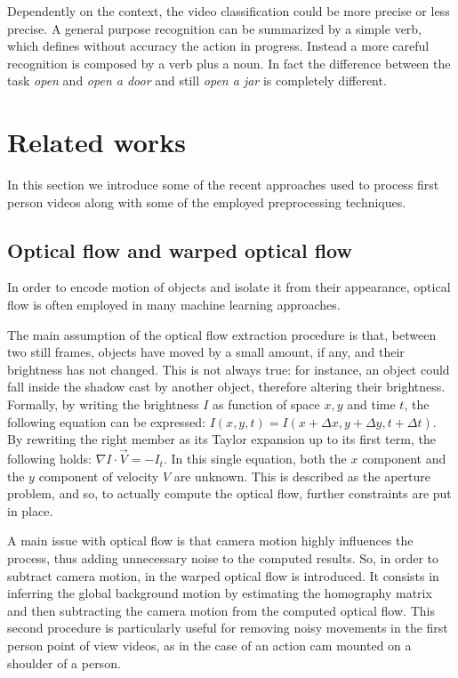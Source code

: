 \documentclass[10pt,twocolumn,letterpaper]{article}
\begin{document}
Dependently on the context, the video classification could be more precise or less precise. A general purpose recognition can be summarized by a simple verb, which defines without accuracy the action in progress. Instead a more careful recognition is composed by a verb plus a noun. In fact the difference between the task \emph{open} and \emph{open a door} and still \emph{open a jar} is completely different.

\section{Related works}

In this section we introduce some of the recent approaches used to process first person videos along with some of the employed preprocessing techniques.

\subsection{Optical flow and warped optical flow}

In order to encode motion of objects and isolate it from their appearance, optical flow is often employed in many machine learning approaches.

The main assumption of the optical flow extraction procedure is that, between two still frames, objects have moved by a small amount, if any, and their brightness has not changed. This is not always true: for instance, an object could fall inside the shadow cast by another object, therefore altering their brightness. Formally, by writing the brightness $I$ as function of space $x,y$ and time $t$, the following equation can be expressed:
${I(x,y,t) = I(x + \Delta x, y + \Delta y, t + \Delta t)}$. By rewriting the right member as its Taylor expansion up to its first term, the following holds: $\nabla I \cdot \vec{V} = -I_t$. In this single equation, both the $x$ component and the $y$ component of velocity $V$ are unknown. This is described as the aperture problem, and so, to actually compute the optical flow, further constraints are put in place.

A main issue with optical flow is that camera motion highly influences the process, thus adding unnecessary noise to the computed results. So, in order to subtract camera motion, in \cite{wang2013trajectiories} the warped optical flow is introduced. It consists in inferring the global background motion by estimating the homography matrix and then subtracting the camera motion from the computed optical flow. This second procedure is particularly useful for removing noisy movements in the first person point of view videos, as in the case of an action cam mounted on a shoulder of a person.
\end{document}
